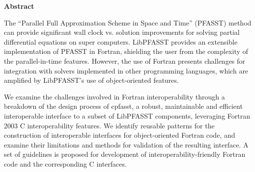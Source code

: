 \clearemptydoublepage
{}
{}

\vspace*{2cm}
\begin{center}
{\Large \textbf{Abstract}}
\end{center}
\vspace{1cm}


The ``Parallel Full Approximation Scheme in Space and Time'' (PFASST) method can provide significant wall clock vs. solution improvements for solving partial differential equations on super computers. LibPFASST provides an extensible implementation of PFASST in Fortran, shielding the user from the complexity of the parallel-in-time features. However, the use of Fortran presents challenges for integration with solvers implemented in other programming languages, which are amplified by LibPFASST's use of object-oriented features. 

We examine the challenges involved in Fortran interoperability through a breakdown of the design process of cpfasst, a robust, maintainable and efficient interoperable interface to a subset of LibPFASST components, leveraging Fortran 2003 C interoperability features. We identify reusable patterns for the construction of interoperable interfaces for object-oriented Fortran code, and examine their limitations and methods for validation of the resulting interface. A set of guidelines is proposed for development of interoperability-friendly Fortran code and the corresponding C interfaces.